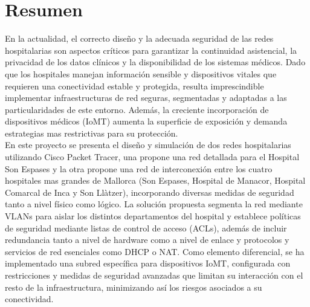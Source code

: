 
\chapter{Resumen}

En la actualidad, el correcto diseño y la adecuada seguridad de las redes hospitalarias son aspectos críticos para garantizar la continuidad asistencial, 
la privacidad de los datos clínicos y la disponibilidad de los sistemas médicos. Dado que los hospitales manejan información sensible y dispositivos 
vitales que requieren una conectividad estable y protegida, resulta imprescindible implementar infraestructuras de red seguras, segmentadas y adaptadas a las 
particularidades de este entorno. Además, la creciente incorporación de dispositivos médicos (IoMT) aumenta la superficie de exposición y demanda 
estrategias mas restrictivas para su protección. \\

En este proyecto se presenta el diseño y simulación de dos redes hospitalarias utilizando Cisco Packet Tracer, una propone una red detallada para el Hospital Son Espases y la otra 
propone una red de interconexión entre los cuatro hospitales mas grandes de Mallorca (Son Espases, Hospital de Manacor, Hospital Comarcal de Inca y Son Llàtzer), incorporando diversas medidas de seguridad tanto a 
nivel físico como lógico. La solución propuesta segmenta la red mediante VLANs para aislar los distintos departamentos del hospital y establece políticas de 
seguridad mediante listas de control de acceso (ACLs), además de incluir redundancia tanto a nivel de hardware como a 
nivel de enlace y protocolos y servicios de red esenciales como DHCP o NAT. Como elemento diferencial, se ha implementado una subred específica para dispositivos IoMT, configurada con restricciones y medidas de seguridad 
avanzadas que limitan su interacción con el resto de la infraestructura, minimizando así los riesgos asociados a su conectividad.